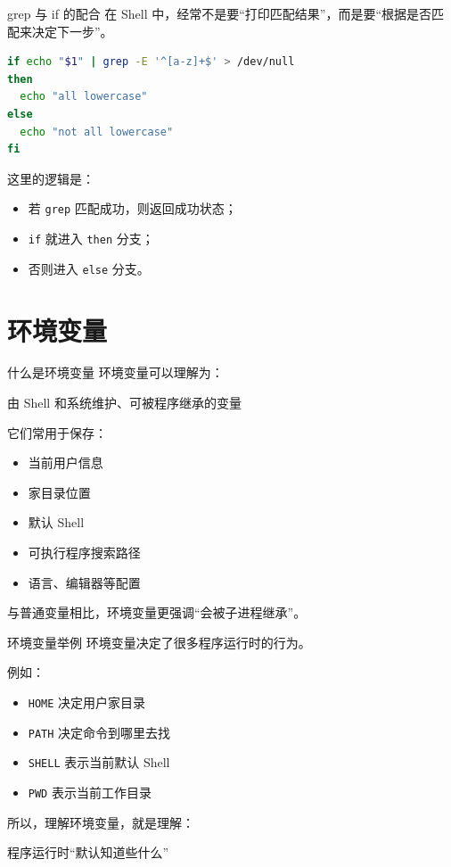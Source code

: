\documentclass[aspectratio=169]{beamer}
\begin{document}
\begin{frame}[fragile]{grep 与 if 的配合}
在 Shell 中，经常不是要“打印匹配结果”，而是要“根据是否匹配来决定下一步”。

\begin{lstlisting}[language=bash]
if echo "$1" | grep -E '^[a-z]+$' > /dev/null
then
  echo "all lowercase"
else
  echo "not all lowercase"
fi
\end{lstlisting}

这里的逻辑是：
\begin{itemize}
  \item 若 \texttt{grep} 匹配成功，则返回成功状态；
  \item \texttt{if} 就进入 \texttt{then} 分支；
  \item 否则进入 \texttt{else} 分支。
\end{itemize}
\end{frame}

\section{环境变量}

\begin{frame}{什么是环境变量}
环境变量可以理解为：

\begin{center}
\Large
由 Shell 和系统维护、可被程序继承的变量
\end{center}

\vspace{0.8em}
它们常用于保存：
\begin{itemize}
  \item 当前用户信息
  \item 家目录位置
  \item 默认 Shell
  \item 可执行程序搜索路径
  \item 语言、编辑器等配置
\end{itemize}

\vspace{0.8em}
与普通变量相比，环境变量更强调“\alert{会被子进程继承}”。
\end{frame}

\begin{frame}{环境变量举例}
环境变量决定了很多程序运行时的行为。

\vspace{0.5em}
例如：
\begin{itemize}
  \item \texttt{HOME} 决定用户家目录
  \item \texttt{PATH} 决定命令到哪里去找
  \item \texttt{SHELL} 表示当前默认 Shell
  \item \texttt{PWD} 表示当前工作目录
\end{itemize}

\vspace{0.8em}
所以，理解环境变量，就是理解：
\begin{center}
\Large
程序运行时“默认知道些什么”
\end{center}
\end{frame}
\end{document}

